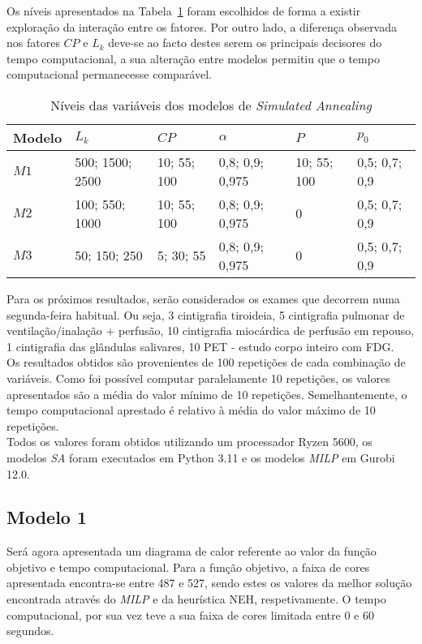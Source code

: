 Os níveis apresentados na Tabela~\ref{tab:niveis_P1} foram escolhidos de forma a existir exploração da interação entre os fatores. Por outro lado, a diferença observada nos fatores $CP$ e $L_{k}$ deve-se ao facto destes serem os principais decisores do tempo computacional, a sua alteração entre modelos permitiu que o tempo computacional permanecesse comparável.\\
\begin{table}[H]
\caption{Níveis das variáveis dos modelos de \textit{Simulated Annealing}}
\label{tab:niveis_P1}
\begin{tabular}{llllll}
\hline
Modelo & $L_{k}$         & $CP$        & $\alpha$        & $P$         & $p_{0}$       \\ \hline
$M1$   & 500; 1500; 2500 & 10; 55; 100 & 0,8; 0,9; 0,975 & 10; 55; 100 & 0,5; 0,7; 0,9 \\
$M2$   & 100; 550; 1000  & 10; 55; 100 & 0,8; 0,9; 0,975 & 0           & 0,5; 0,7; 0,9 \\
$M3$   & 50; 150; 250    & 5; 30; 55   & 0,8; 0,9; 0,975 & 0           & 0,5; 0,7; 0,9 
\end{tabular}
\end{table}

Para os próximos resultados, serão considerados os exames que decorrem numa segunda-feira habitual. Ou seja, 3 cintigrafia tiroideia, 5 cintigrafia pulmonar de ventilação/inalação + perfusão, 10 cintigrafia miocárdica de perfusão em repouso, 1 cintigrafia das glândulas salivares, 10 PET - estudo corpo inteiro com FDG.\\
Os resultados obtidos são provenientes de 100 repetições de cada combinação de variáveis. Como foi possível computar paralelamente 10 repetições, os valores apresentados são a média do valor mínimo de 10 repetições. Semelhantemente, o tempo computacional aprestado é relativo à média do valor máximo de 10 repetições.\\
Todos os valores foram obtidos utilizando um processador Ryzen 5600, os modelos \textit{SA} foram executados em Python 3.11 e os modelos \textit{MILP} em Gurobi 12.0.\\

\subsection{Modelo 1}

Será agora apresentada um diagrama de calor referente ao valor da função objetivo e tempo computacional. Para a função objetivo, a faixa de cores apresentada encontra-se entre 487 e 527, sendo estes os valores da melhor solução encontrada através do \textit{MILP} e da heurística NEH, respetivamente. O tempo computacional, por sua vez teve a sua faixa de cores limitada entre 0 e 60 segundos.\\


